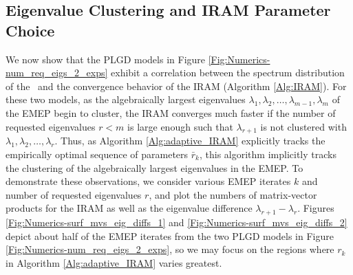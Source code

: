 \subsection{Eigenvalue Clustering and IRAM Parameter Choice}		\label{Subsubsec:evol_mats-correl_clustering_IRAM_param}




We now show that the PLGD models in Figure \ref{Fig:Numerics-num_req_eigs_2_exps} exhibit a correlation between the spectrum distribution of the \emep \ and the convergence behavior of the IRAM (Algorithm \ref{Alg:IRAM}).
For these two models, as the algebraically largest eigenvalues $\lambda_1, \lambda_2, \ldots, \lambda_{m-1}, \lambda_{m}$ of the EMEP begin to cluster, 
the IRAM converges much faster if the number of requested eigenvalues $r<m$ is large enough such that $\lambda_{r+1}$ is not clustered with $\lambda_1, \lambda_2, \ldots, \lambda_r$.
Thus, as Algorithm \ref{Alg:adaptive_IRAM} explicitly tracks the empirically optimal sequence of parameters $\bar{r}_k$, this algorithm implicitly tracks the clustering of the algebraically largest eigenvalues in the EMEP.
To demonstrate these observations, we consider various EMEP iterates $k$ and number of requested eigenvalues $r$, and plot the numbers of matrix-vector products for the IRAM as well as the eigenvalue difference $\lambda_{r+1} - \lambda_r$.
Figures \ref{Fig:Numerics-surf_mvs_eig_diffs_1} and \ref{Fig:Numerics-surf_mvs_eig_diffs_2} depict about half of the EMEP iterates from the two PLGD models in Figure \ref{Fig:Numerics-num_req_eigs_2_exps}, so we may focus on the regions where $r_k$ in Algorithm \ref{Alg:adaptive_IRAM} varies greatest.





